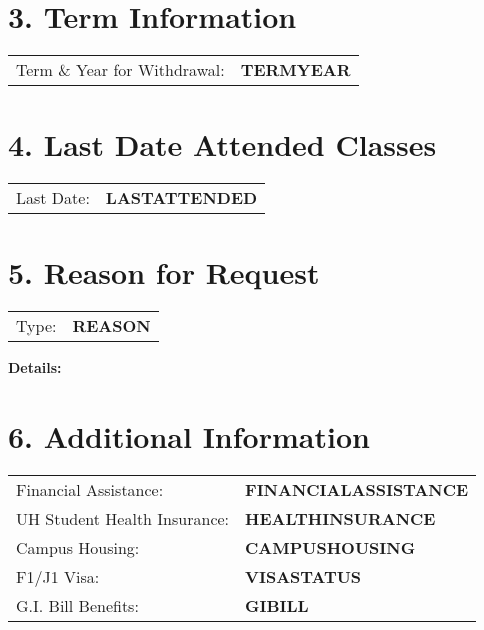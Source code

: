 \documentclass[12pt]{article}
\begin{document}
\vspace{0.5cm}

\section*{3. Term Information}
\begin{tabular}{ll}
Term \& Year for Withdrawal: & \textbf{ {{TERMYEAR}} } \\
\end{tabular}

\vspace{0.5cm}

\section*{4. Last Date Attended Classes}
\begin{tabular}{ll}
Last Date: & \textbf{ {{LASTATTENDED}} } \\
\end{tabular}

\vspace{0.5cm}

\section*{5. Reason for Request}
\begin{tabular}{ll}
Type: & \textbf{ {{REASON}} } \\
\end{tabular}

\noindent\textbf{Details:}\\

\vspace{0.5cm}

\section*{6. Additional Information}
\begin{tabular}{ll}
Financial Assistance: & \textbf{ {{FINANCIALASSISTANCE}} } \\
UH Student Health Insurance: & \textbf{ {{HEALTHINSURANCE}} } \\
Campus Housing: & \textbf{ {{CAMPUSHOUSING}} } \\
F1/J1 Visa: & \textbf{ {{VISASTATUS}} } \\
G.I. Bill Benefits: & \textbf{ {{GIBILL}} } \\
\end{tabular}
\end{document}
